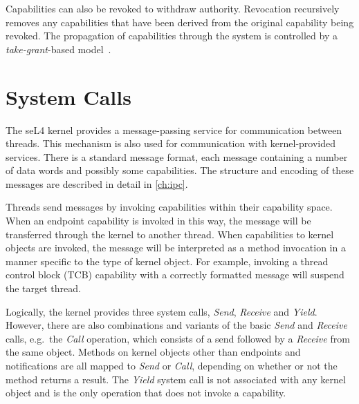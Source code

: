 Capabilities can also be revoked to withdraw
authority. Revocation recursively removes any capabilities that have
been derived from the original capability being revoked. The propagation of
capabilities through the system is controlled by a
\emph{take-grant}-based model~\cite{Elkaduwe_GE_08,Boyton_09}.

\section{System Calls}
\label{sec:syscalls}
\label{sec:sys_send}
\label{sec:sys_wait}
\label{sec:sys_call}
\label{sec:sys_reply}
\label{sec:sys_nbsend}
\label{sec:sys_replywait}
\label{sec:sys_nbwait}
\label{sec:sys_yield}

The seL4 kernel provides a message-passing service for communication between
threads. This mechanism is also used for communication with kernel-provided
services. There is a standard message format, each message containing a
number of data words and possibly some capabilities. The structure and encoding
of these messages are described in detail in \autoref{ch:ipc}. 

Threads send messages by invoking capabilities within their capability space.
When an endpoint capability is invoked in this way, the message will be
transferred through the kernel to another thread. When capabilities to kernel
objects are invoked, the message will be interpreted as a method invocation in a
manner specific to the type of kernel object. For example, invoking a thread
control block (TCB) capability with a correctly formatted message will suspend
the target thread.

Logically, the kernel provides three system calls, \emph{Send},
\emph{Receive} and \emph{Yield}. However, there are also combinations
and variants of the basic \emph{Send} and \emph{Receive} calls, e.g.\
the \emph{Call} operation, which consists of a send followed by a
\emph{Receive} from the same object. Methods on kernel objects other
than endpoints and notifications are all mapped to \emph{Send} or
\emph{Call}, depending on whether or not the method returns a
result. The \emph{Yield} system call is not associated with any kernel
object and is the only operation that does not invoke a capability.

